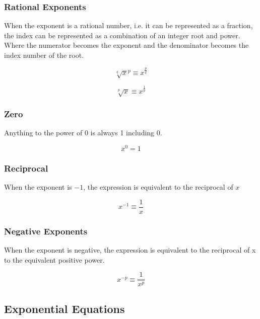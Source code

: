 \documentclass[a4paper]{article}
\begin{document}
\subsubsection{Rational Exponents}
When the exponent is a rational number, i.e. it can be represented as a fraction,
the index can be represented as a combination of an integer root and power. Where
the numerator becomes the exponent and the denominator becomes the index number of the root.

\begin{equation}
	\label{simple_equation}
	\sqrt[q]{x}^{p} \equiv x^{\frac{p}{q}}
\end{equation}


\begin{equation}
	\label{simple_equation}
	\sqrt[p]{x} \equiv x^{\frac{1}{p}}
\end{equation}

\subsubsection{Zero}
Anything to the power of 0 is always 1 including 0.

\begin{equation}
	\label{simple_equation}
	x^0 = 1
\end{equation}

\subsubsection{Reciprocal}
When the exponent is $-1$, the expression is equivalent to the reciprocal of $x$

\begin{equation}
	\label{simple_equation}
	x^{-1} \equiv \frac{1}{x}
\end{equation}

\subsubsection{Negative Exponents}
When the exponent is negative, the expression is equivalent to the reciprocal of x to the equivalent positive power.

\begin{equation}
	\label{simple_equation}
	x^{-p} \equiv \frac{1}{x^p}
\end{equation}

\subsection{Exponential Equations}
\end{document}
